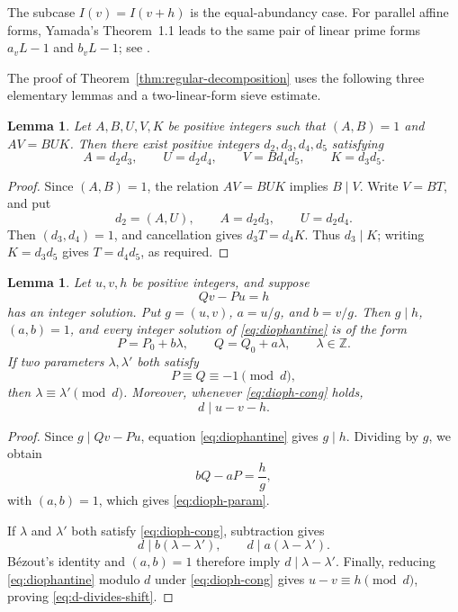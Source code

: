 \documentclass[11pt,reqno]{amsart}
\numberwithin{equation}{section}
\theoremstyle{plain}
\newtheorem{lemma}[theorem]{Lemma}
\theoremstyle{definition}
\theoremstyle{remark}
\newcommand{\Z}{\mathbb Z}
\begin{document}
The subcase $I(v)=I(v+h)$ is the equal-abundancy case. For parallel affine forms, Yamada's Theorem~1.1 leads to the same pair of linear prime forms $a_vL-1$ and $b_vL-1$; see
\cite[Theorem~1.1]{Yamada2017}.

The proof of Theorem~\ref{thm:regular-decomposition} uses the following three elementary lemmas and a two-linear-form sieve estimate.

\begin{lemma}\label{lem:factor-allocation}
Let $A,B,U,V,K$ be positive integers such that $(A,B)=1$ and $AV=BUK$. Then there exist positive integers $d_2,d_3,d_4,d_5$ satisfying
\[
A=d_2d_3,\qquad
U=d_2d_4,\qquad
V=Bd_4d_5,\qquad
K=d_3d_5.
\]
\end{lemma}
\begin{proof}
Since $(A,B)=1$, the relation $AV=BUK$ implies $B\mid V$. Write $V=BT$, and put
\[
d_2=(A,U),\qquad A=d_2d_3,\qquad U=d_2d_4.
\]
Then $(d_3,d_4)=1$, and cancellation gives $d_3T=d_4K$. Thus $d_3\mid K$; writing $K=d_3d_5$ gives $T=d_4d_5$, as required.
\end{proof}

\begin{lemma}\label{lem:diophantine}
Let $u,v,h$ be positive integers, and suppose
\begin{equation}\label{eq:diophantine}
Qv-Pu=h
\end{equation}
has an integer solution. Put $g=(u,v)$, $a=u/g$, and $b=v/g$. Then $g\mid h$, $(a,b)=1$, and every integer solution of \eqref{eq:diophantine} is of the form
\begin{equation}\label{eq:dioph-param}
P=P_0+b\lambda,
\qquad
Q=Q_0+a\lambda,
\qquad
\lambda\in\Z.
\end{equation}
If two parameters $\lambda,\lambda'$ both satisfy
\begin{equation}\label{eq:dioph-cong}
P\equiv Q\equiv-1\pmod d,
\end{equation}
then $\lambda\equiv\lambda'\pmod d$. Moreover, whenever \eqref{eq:dioph-cong} holds,
\begin{equation}\label{eq:d-divides-shift}
d\mid u-v-h.
\end{equation}
\end{lemma}
\begin{proof}
Since $g\mid Qv-Pu$, equation \eqref{eq:diophantine} gives $g\mid h$. Dividing by $g$, we obtain
\[
bQ-aP=\frac hg,
\]
with $(a,b)=1$, which gives \eqref{eq:dioph-param}.

If $\lambda$ and $\lambda'$ both satisfy \eqref{eq:dioph-cong}, subtraction gives
\[
d\mid b(\lambda-\lambda'),
\qquad
d\mid a(\lambda-\lambda').
\]
B\'ezout's identity and $(a,b)=1$ therefore imply $d\mid\lambda-\lambda'$. Finally, reducing \eqref{eq:diophantine} modulo $d$ under \eqref{eq:dioph-cong} gives $u-v\equiv h\pmod d$, proving \eqref{eq:d-divides-shift}.
\end{proof}
\end{document}
